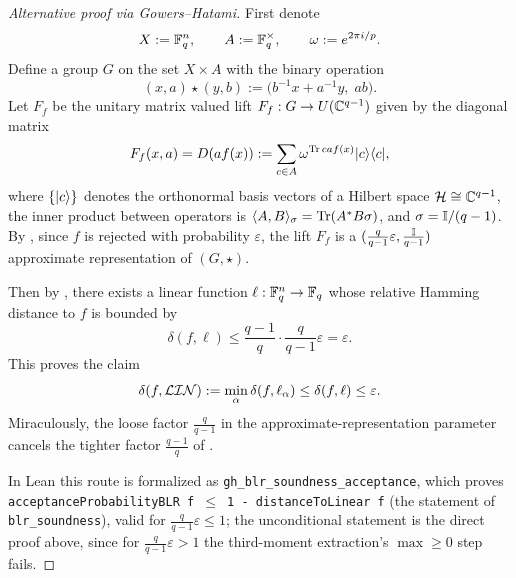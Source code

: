 \begin{proof}[Alternative proof via Gowers–Hatami]\leanok
First denote
\[
X := \mathbb{F}_q^n, \qquad A := \mathbb{F}_q^\times, \qquad \omega := e^{2\pi i/p}.
\]
Define a group $G$ on the set $X \times A$ with the binary operation
\[
(x, a) \star (y, b) := \bigl(b^{-1}x + a^{-1}y,\; ab\bigr).
\]
Let $F_f$ be the unitary matrix valued lift $F_f : G \to U(\mathbb{C}^{q-1})$ given by the diagonal matrix
\[
F_f(x, a) = D(a f(x)) := \sum_{c \in A} \omega^{{\rm Tr}\, c a f(x)}\mbox{$ | c \rangle $}\mbox{$ \langle c | $},
\]
where $\{\mbox{$ | c \rangle $}\}$ denotes the orthonormal basis vectors of a Hilbert space $\mathcal{H} \cong \mathbb{C}^{q-1}$, the
inner product between operators is $\langle A, B \rangle_\sigma={\rm Tr}(A^* B \sigma)$, and $\sigma = \mathbb{I}/(q-1)$. By
, since $f$ is rejected with probability $\varepsilon$, the lift $F_f$ is a
$(\frac{q}{q-1}\varepsilon,\frac{\mathbb{I}}{q-1})$ approximate representation of $(G, \star)$.

Then by , there exists a linear function $\ell: \mathbb{F}_q^n \to \mathbb{F}_q$ whose
relative Hamming distance to $f$ is bounded by
\[
    \delta(f, \ell) \le \frac{q-1}{q}\cdot\frac{q}{q-1}\varepsilon = \varepsilon.
\]
This proves the claim
\[
\delta(f, \mathcal{LIN}) := \min_{\alpha} \delta(f, \ell_\alpha) \leq \delta(f, \ell) \leq \varepsilon.
\]
Miraculously, the loose factor $\frac{q}{q-1}$ in the approximate-representation parameter cancels the tighter
factor $\frac{q-1}{q}$ of .

In Lean this route is formalized as \texttt{gh\_blr\_soundness\_acceptance}, which proves
\texttt{acceptanceProbabilityBLR f $\le$ 1 - distanceToLinear f} (the statement of \texttt{blr\_soundness}),
valid for $\frac{q}{q-1}\varepsilon\le1$; the unconditional statement is the direct proof above, since for
$\frac{q}{q-1}\varepsilon>1$ the third-moment extraction's $\max\ge0$ step fails.
\end{proof}



